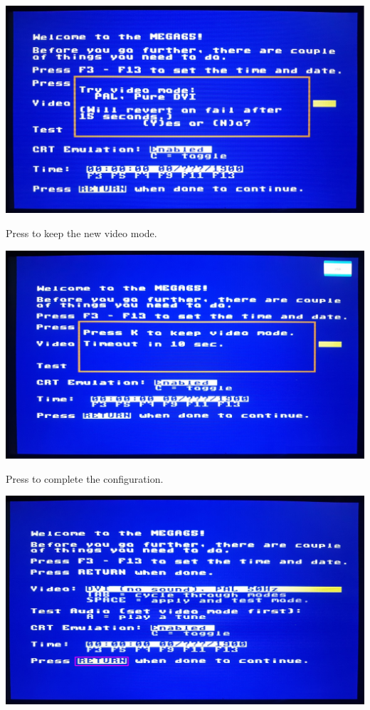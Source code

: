 \begin{center}
  \includegraphics[width=\linewidth]{images/img011_final_boot_03.jpg}
\end{center}

Press  to keep the new video mode.

\begin{center}
  \includegraphics[width=\linewidth]{images/img011_final_boot_04.jpg}
\end{center}

Press  to complete the configuration.

\begin{center}
  \includegraphics[width=\linewidth]{images/img011_final_boot_05.png}
\end{center}

